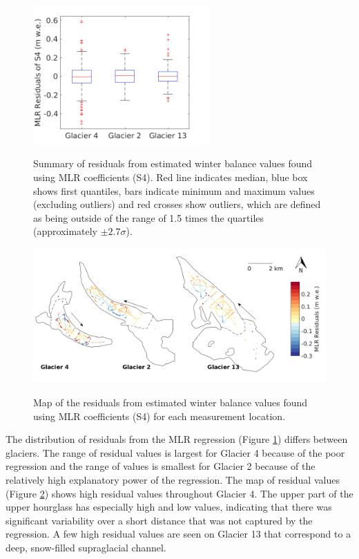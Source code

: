\documentclass{sfuthesis}
\newcommand{\boxMatlab}{Red line indicates median, blue box shows first quantiles, bars indicate minimum and maximum values (excluding outliers) and red crosses show outliers, which are defined as being outside of the range of 1.5 times the quartiles (approximately $\pm2.7\sigma$). }
\begin{document}
{\begin{figure}[H]
\centering
	\includegraphics[width =0.6\textwidth]{residuals_box_MLR.png}\\
\caption[Summary of residuals from estimated winter balance values found using MLR coefficients (S4)]{Summary of residuals from estimated winter balance values found using MLR coefficients (S4). \boxMatlab}
\label{fig:MLRresidualsboxplot}
\end{figure} 

\begin{figure}[H]
	\centering
	\includegraphics[width =\textwidth]{residualsMap_MLR.png}\\
	\caption{Map of the residuals from estimated winter balance values found using MLR coefficients (S4) for each measurement location.}
	\label{fig:MLR_residualsMap}
\end{figure} 


The distribution of residuals from the MLR regression (Figure \ref{fig:MLRresidualsboxplot}) differs between glaciers. The range of residual values is largest for Glacier 4 because of the poor regression and the range of values is smallest for Glacier 2 because of the relatively high explanatory power of the regression. The map of residual values (Figure \ref{fig:MLR_residualsMap}) shows high residual values throughout Glacier 4. The upper part of the upper hourglass has especially high and low values, indicating that there was significant variability over a short distance that was not captured by the regression. A few high residual values are seen on Glacier 13 that correspond to a deep, snow-filled supraglacial channel.

}
\end{document}
